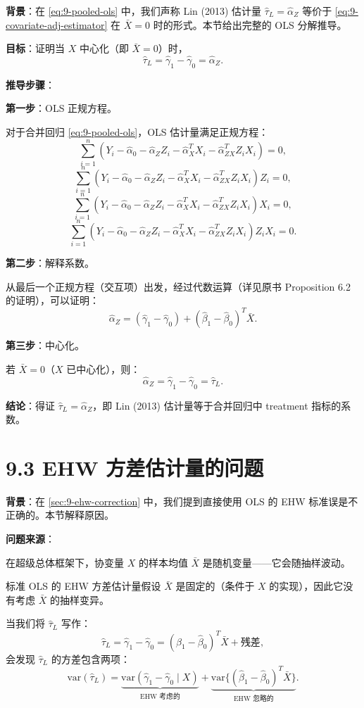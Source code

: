 \textbf{背景}：在 \cref{eq:9-pooled-ols} 中，我们声称 Lin (2013) 估计量 $\hat{\tau}_L = \hat{\alpha}_Z$ 等价于 \cref{eq:9-covariate-adj-estimator} 在 $\bar{X}=0$ 时的形式。本节给出完整的 OLS 分解推导。

\textbf{目标}：证明当 $X$ 中心化（即 $\bar{X}=0$）时，
\[
\hat{\tau}_L = \hat{\gamma}_1 - \hat{\gamma}_0 = \hat{\alpha}_Z.
\]

\textbf{推导步骤}：

\textbf{第一步}：OLS 正规方程。

对于合并回归 \cref{eq:9-pooled-ols}，OLS 估计量满足正规方程：
\[
\sum_{i=1}^n (Y_i - \hat{\alpha}_0 - \hat{\alpha}_Z Z_i - \hat{\alpha}_X^T X_i - \hat{\alpha}_{ZX}^T Z_i X_i) = 0,
\]
\[
\sum_{i=1}^n (Y_i - \hat{\alpha}_0 - \hat{\alpha}_Z Z_i - \hat{\alpha}_X^T X_i - \hat{\alpha}_{ZX}^T Z_i X_i) Z_i = 0,
\]
\[
\sum_{i=1}^n (Y_i - \hat{\alpha}_0 - \hat{\alpha}_Z Z_i - \hat{\alpha}_X^T X_i - \hat{\alpha}_{ZX}^T Z_i X_i) X_i = 0,
\]
\[
\sum_{i=1}^n (Y_i - \hat{\alpha}_0 - \hat{\alpha}_Z Z_i - \hat{\alpha}_X^T X_i - \hat{\alpha}_{ZX}^T Z_i X_i) Z_i X_i = 0.
\]

\textbf{第二步}：解释系数。

从最后一个正规方程（交互项）出发，经过代数运算（详见原书 Proposition 6.2 的证明），可以证明：
\[
\hat{\alpha}_Z = (\hat{\gamma}_1 - \hat{\gamma}_0) + (\hat{\beta}_1 - \hat{\beta}_0)^T \bar{X}.
\]

\textbf{第三步}：中心化。

若 $\bar{X} = 0$（$X$ 已中心化），则：
\[
\hat{\alpha}_Z = \hat{\gamma}_1 - \hat{\gamma}_0 = \hat{\tau}_L.
\]

\textbf{结论}：得证 $\hat{\tau}_L = \hat{\alpha}_Z$，即 Lin (2013) 估计量等于合并回归中 treatment 指标的系数。

\section{9.3 EHW 方差估计量的问题}\label{sec:appendix-9-ehw-issue}

\textbf{背景}：在 \cref{sec:9-ehw-correction} 中，我们提到直接使用 OLS 的 EHW 标准误是不正确的。本节解释原因。

\textbf{问题来源}：

在超级总体框架下，协变量 $X$ 的样本均值 $\bar{X}$ 是随机变量——它会随抽样波动。

标准 OLS 的 EHW 方差估计量假设 $\bar{X}$ 是固定的（条件于 $X$ 的实现），因此它没有考虑 $\bar{X}$ 的抽样变异。

当我们将 $\hat{\tau}_L$ 写作：
\[
\hat{\tau}_L = \hat{\gamma}_1 - \hat{\gamma}_0 = (\hat{\beta}_1 - \hat{\beta}_0)^T \bar{X} + \text{残差},
\]
会发现 $\hat{\tau}_L$ 的方差包含两项：
\[
\mathrm{var}(\hat{\tau}_L) = \underbrace{\mathrm{var}(\hat{\gamma}_1 - \hat{\gamma}_0 \mid X)}_{\text{EHW 考虑的}} + \underbrace{\mathrm{var}\{(\hat{\beta}_1 - \hat{\beta}_0)^T \bar{X}\}}_{\text{EHW 忽略的}}.
\]

